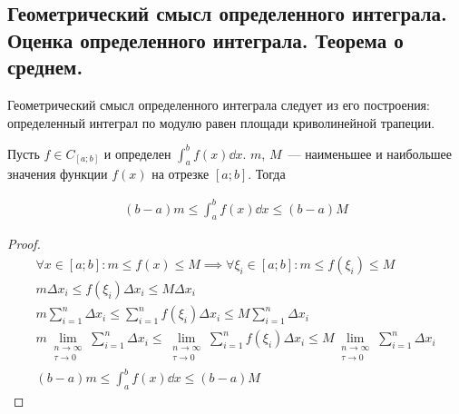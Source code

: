 \subsection{%
  Геометрический смысл определенного интеграла. Оценка определенного интеграла.
  Теорема о среднем.%
}

Геометрический смысл определенного интеграла следует из его построения:
определенный интеграл по модулю равен площади криволинейной трапеции.

\begin{lemma}\label{int-est}
  Пусть \(f \in C_{[a;b]}\) и определен \(\int_{a}^{b} f(x) \dd x\).
  \(m\), \(M\)~--- наименьшее и наибольшее значения функции \(f(x)\) на
  отрезке \([a;b]\). Тогда

  \begin{align*}
    (b - a) m \le \int_{a}^{b} f(x) \dd x \le (b - a) M
  \end{align*}
\end{lemma}
\begin{proof}
  \begin{align*}
    \forall x \in [a;b] \colon m \le f(x) \le M
    \implies \forall \xi_{i} \in [a;b] \colon m \le f(\xi_{i}) \le M
    \\
    m \Delta x_{i} \le f(\xi_{i}) \Delta x_{i} \le M \Delta x_{i}
    \\
      m \sum_{i = 1}^{n} \Delta x_{i}
    \le 
      \sum_{i = 1}^{n} f(\xi_{i}) \Delta x_{i}
    \le 
      M \sum_{i = 1}^{n} \Delta x_{i}
    \\
      m \lim_{\substack{n \to \infty \\ \tau \to 0}}
      \sum_{i = 1}^{n} \Delta x_{i}
    \le 
      \lim_{\substack{n \to \infty \\ \tau \to 0}}
      \sum_{i = 1}^{n} f(\xi_{i}) \Delta x_{i}
    \le 
      M \lim_{\substack{n \to \infty \\ \tau \to 0}}
      \sum_{i = 1}^{n} \Delta x_{i}
    \\
    (b - a) m \le \int_{a}^{b} f(x) \dd x \le (b - a) M
  \end{align*}
\end{proof}

